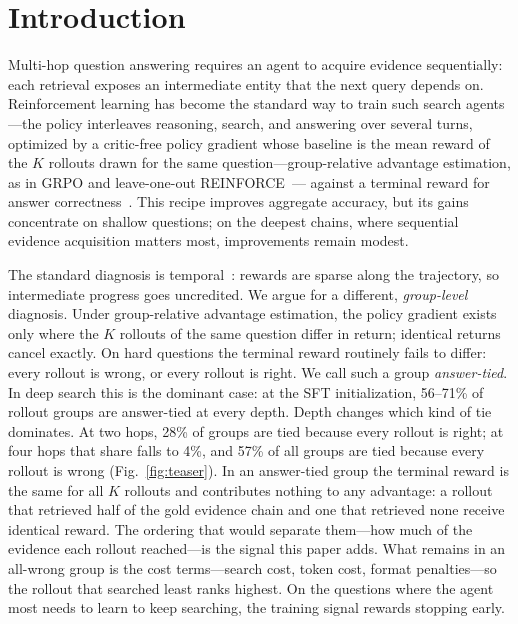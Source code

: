 
\section{Introduction}
\label{sec:intro}

  Multi-hop question answering requires an agent to acquire evidence
  sequentially: each retrieval exposes an intermediate entity that the next
  query depends on. Reinforcement learning has become the standard way to
  train such search agents---the policy interleaves reasoning, search, and
  answering over several turns, optimized by a critic-free policy
  gradient whose baseline is the mean reward of the $K$ rollouts drawn
  for the same question---group-relative advantage estimation, as in
  GRPO and leave-one-out
  REINFORCE~\citep{shao2024deepseekmath,ahmadian2024rloo,kool2019buy}---
  against a terminal reward for answer
  correctness~\citep{jin2025searchr1,chen2025research,song2025r1searcher,
  sun2026zerosearch}. This recipe improves aggregate accuracy, but its gains
  concentrate on shallow questions; on the deepest chains, where sequential
  evidence acquisition matters most, improvements remain modest.

  The standard diagnosis is temporal~\citep{zheng-etal-2025-stepsearch}:
  rewards are sparse along the trajectory, so intermediate progress goes
  uncredited. We argue for a
  different, \emph{group-level} diagnosis. Under group-relative advantage
  estimation, the policy gradient exists only where the $K$ rollouts of
  the same question differ in return; identical returns cancel exactly.
  On hard questions the terminal reward routinely fails to differ: every
  rollout is wrong, or every rollout is right. We call such a group
  \emph{answer-tied}. In deep search this is the dominant case: at the
  SFT initialization, 56--71\% of rollout groups are answer-tied at every
  depth. Depth changes which kind of tie dominates. At two hops, 28\% of
  groups are tied because every rollout is right; at four hops that share
  falls to 4\%, and 57\% of all groups are tied because every rollout is
  wrong (Fig.~\ref{fig:teaser}). In an
  answer-tied group the terminal reward is the same for all $K$ rollouts
  and contributes nothing to any advantage: a rollout that retrieved half
  of the gold evidence chain and one that retrieved none receive identical
  reward. The ordering that would separate them---how much of the
  evidence each rollout reached---is the signal this paper adds. What
  remains in an all-wrong group is the cost terms---search cost, token
  cost, format penalties---so the rollout that searched least ranks
  highest. On the questions where the agent most needs to learn to keep
  searching, the training signal rewards stopping early.

